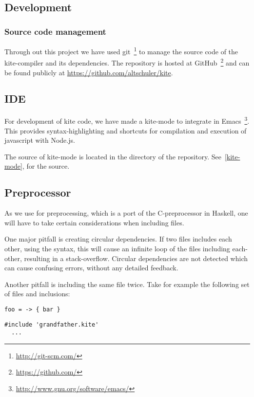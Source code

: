 
\subsection{Development}
\subsubsection{Source code management}
Through out this project we have used
git~\footnote{\url{http://git-scm.com/}} to manage the source code of
the kite-compiler and its dependencies. The repository is hosted at
GitHub~\footnote{\url{https://github.com/}} and can be found publicly at
\url{https://github.com/altschuler/kite}.

\subsection{IDE}
For development of kite code, we have made a kite-mode to integrate in
Emacs~\footnote{\url{http://www.gnu.org/software/emacs/}}. This
provides syntax-highlighting and shortcuts for compilation and
execution of javascript with Node.js.

The source of kite-mode is located in the  directory of
the repository. See~\ref{kite-mode}, for the source.


\subsection{Preprocessor}
As we use \cite{wallace04} for preprocessing, which is a
port of the C-preprocessor in Haskell, one will have to take certain
considerations when including files.

One major pitfall is creating circular dependencies. If two files includes
each other, using the  syntax, this will
cause an infinite loop of the files including each-other, resulting in
a stack-overflow. Circular dependencies are not detected which can
cause confusing errors, without any detailed feedback.

Another pitfall is including the same file twice. Take for example the
following set of files and inclusions:

\begin{lstlisting}[caption=\code{grandfather.kite}]
  foo = -> { bar }
\end{lstlisting}

\begin{lstlisting}[caption=\code{father.kite}]
  #include 'grandfather.kite'
  ...
\end{lstlisting}

